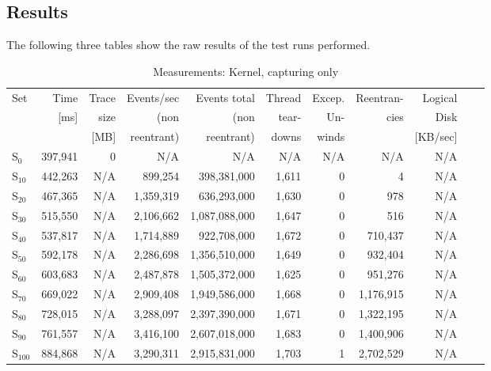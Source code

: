 \subsection{Results}

The following three tables show the raw results of the test runs performed. 

\begin{table}[h] 
\footnotesize
\addtolength{\tabcolsep}{-2pt}
\caption{Measurements: Kernel, capturing only}
\label{MeasurementsKernelCapturing}
\centering          

\begin{tabular}{l r r r r r r r r r r}    
\hline\hline 
Set				&	Time 		&	Trace &	Events/sec	&Events total	&	Thread 		&	Excep. 	&	Reentran-	&	Logical		 \\
					& [ms]		& size & (non					&(non 				&	tear-			& Un-			& cies			& Disk	 \\
					& 				& [MB] & reentrant)		& reentrant)	& downs			&	winds		&						& [KB/sec]				\\
\hline
S$_{0}$   &	397,941	&	0	&	N/A	&	N/A	&	N/A	&	N/A	&	N/A	&	N/A	\\
\hline
S$_{10}$ 	&	442,263	&	N/A	&	899,254	&	398,381,000	&	1,611	&	0	&	4	&	N/A		\\
S$_{20}$ 	&	467,365	&	N/A	&	1,359,319	&	636,293,000	&	1,630	&	0	&	978	&	N/A		\\
S$_{30}$ 	&	515,550	&	N/A	&	2,106,662	&	1,087,088,000	&	1,647	&	0	&	516	&	N/A		\\
S$_{40}$ 	&	537,817	&	N/A	&	1,714,889	&	922,708,000	&	1,672	&	0	&	710,437	&	N/A		\\
S$_{50}$ 	&	592,178	&	N/A	&	2,286,698	&	1,356,510,000	&	1,649	&	0	&	932,404	&	N/A		\\
S$_{60}$ 	&	603,683	&	N/A	&	2,487,878	&	1,505,372,000	&	1,625	&	0	&	951,276	&	N/A		\\
S$_{70}$ 	&	669,022	&	N/A	&	2,909,408	&	1,949,586,000	&	1,668	&	0	&	1,176,915	&	N/A		\\
S$_{80}$ 	&	728,015	&	N/A	&	3,288,097	&	2,397,390,000	&	1,671	&	0	&	1,322,195	&	N/A		\\
S$_{90}$ 	&	761,557	&	N/A	&	3,416,100	&	2,607,018,000	&	1,683	&	0	&	1,400,906	&	N/A		\\
S$_{100}$	&	884,868	&	N/A	&	3,290,311	&	2,915,831,000	&	1,703	&	1	&	2,702,529	&	N/A		\\
\hline
\end{tabular}
\end{table}

